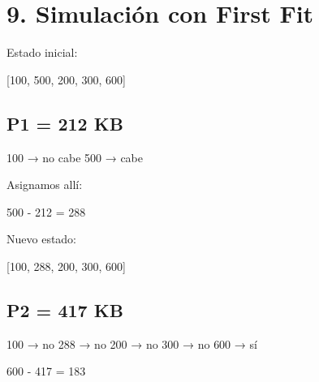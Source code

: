 \documentclass[
  spanish,
  letterpaper,
]{scrbook}
\newenvironment{Shaded}{\begin{snugshade}}{\end{snugshade}}
\newcommand{\NormalTok}[1]{\textcolor[rgb]{0.00,0.23,0.31}{#1}}
\begin{document}
\chapter{9. Simulación con First Fit}\label{simulaciuxf3n-con-first-fit}

Estado inicial:

\begin{Shaded}
\begin{Highlighting}[]
\NormalTok{[100, 500, 200, 300, 600]}
\end{Highlighting}
\end{Shaded}

\section{P1 = 212 KB}\label{p1-212-kb}

\begin{Shaded}
\begin{Highlighting}[]
\NormalTok{100 → no cabe}
\NormalTok{500 → cabe}
\end{Highlighting}
\end{Shaded}

Asignamos allí:

\begin{Shaded}
\begin{Highlighting}[]
\NormalTok{500 {-} 212 = 288}
\end{Highlighting}
\end{Shaded}

Nuevo estado:

\begin{Shaded}
\begin{Highlighting}[]
\NormalTok{[100, 288, 200, 300, 600]}
\end{Highlighting}
\end{Shaded}

\section{P2 = 417 KB}\label{p2-417-kb}

\begin{Shaded}
\begin{Highlighting}[]
\NormalTok{100 → no}
\NormalTok{288 → no}
\NormalTok{200 → no}
\NormalTok{300 → no}
\NormalTok{600 → sí}
\end{Highlighting}
\end{Shaded}

\begin{Shaded}
\begin{Highlighting}[]
\NormalTok{600 {-} 417 = 183}
\end{Highlighting}
\end{Shaded}
\end{document}
